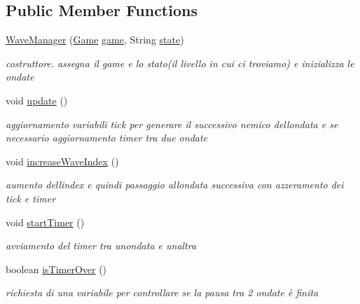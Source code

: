\subsection*{Public Member Functions}
\begin{DoxyCompactItemize}
\item 
\hyperlink{classmanagers_1_1_wave_manager_a4f9054a370c040f84d220fce947314f2}{Wave\+Manager} (\hyperlink{classprogetto_1_1_game}{Game} \hyperlink{classmanagers_1_1_wave_manager_ac6a5ed6191fcf3a5bf0445921feb4f48}{game}, String \hyperlink{classmanagers_1_1_wave_manager_a91ac952876f776b3fbbc8519e093fdbf}{state})
\begin{DoxyCompactList}\small\item\em costruttore. assegna il game e lo stato(il livello in cui ci troviamo) e inizializza le ondate \end{DoxyCompactList}\item 
void \hyperlink{classmanagers_1_1_wave_manager_ac5c54df7ed3b930268c8d7752c101725}{update} ()
\begin{DoxyCompactList}\small\item\em aggiornamento variabili tick per generare il successivo nemico dell\textquotesingle{}ondata e se necessario aggiornamento timer tra due ondate \end{DoxyCompactList}\item 
void \hyperlink{classmanagers_1_1_wave_manager_a30f46b71db254d0e9ca9e7f3578134c3}{increase\+Wave\+Index} ()
\begin{DoxyCompactList}\small\item\em aumento dell\textquotesingle{}index e quindi passaggio all\textquotesingle{}ondata successiva con azzeramento dei tick e timer \end{DoxyCompactList}\item 
void \hyperlink{classmanagers_1_1_wave_manager_aec53975ffc59ffaf3080db21af0d2f6e}{start\+Timer} ()
\begin{DoxyCompactList}\small\item\em avviamento del timer tra un\textquotesingle{}ondata e un\textquotesingle{}altra \end{DoxyCompactList}\item 
boolean \hyperlink{classmanagers_1_1_wave_manager_ab68417e6738c05037923f5f0f21eb586}{is\+Timer\+Over} ()
\begin{DoxyCompactList}\small\item\em richiesta di una variabile per controllare se la pausa tra 2 ondate è finita \end{DoxyCompactList}\item 

\end{DoxyCompactItemize}
